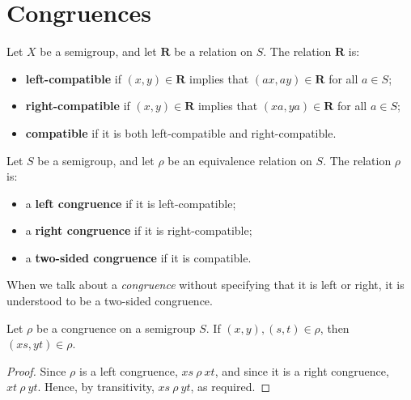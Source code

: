 \section{Congruences}
\label{sec:intro-congs}

\begin{definition}
  \label{def:compatible}
  Let $X$ be a semigroup, and let $\mathbf{R}$ be a relation on $S$.  The
  relation $\mathbf{R}$ is:
  \begin{itemize}
  \item \textbf{left-compatible} if $(x, y) \in \mathbf{R}$ implies that
    $(ax, ay) \in \mathbf{R}$ for all $a \in S$;
  \item \textbf{right-compatible} if $(x, y) \in \mathbf{R}$ implies that
    $(xa, ya) \in \mathbf{R}$ for all $a \in S$;
  \item \textbf{compatible} if it is both left-compatible and
    right-compatible.
  \end{itemize}
\end{definition}

\begin{definition}
  \label{def:congruence}
  Let $S$ be a semigroup, and let $\rho$ be an equivalence relation on $S$.  The
  relation $\rho$ is:
  \begin{itemize}
  \item a \textbf{left congruence} if it is left-compatible;
  \item a \textbf{right congruence} if it is right-compatible;
  \item a \textbf{two-sided congruence} if it is compatible.
  \end{itemize}
\end{definition}

When we talk about a \textit{congruence} without specifying that it is left or
right, it is understood to be a two-sided congruence.

\begin{proposition}
  \label{prop:cong-def}
  Let $\rho$ be a congruence on a semigroup $S$.  If $(x, y), (s, t) \in \rho$,
  then $(xs, yt) \in \rho$.
  \begin{proof}
    Since $\rho$ is a left congruence, $xs ~\rho~ xt$, and since it is a right
    congruence, $xt ~\rho~ yt$.  Hence, by transitivity, $xs ~\rho~ yt$, as
    required.
  \end{proof}
\end{proposition}

